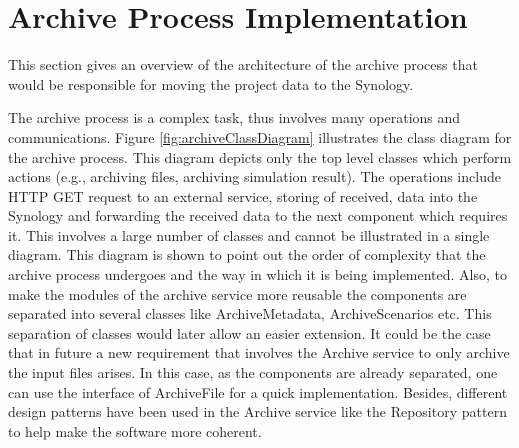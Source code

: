 \section{Archive Process Implementation}
This section gives an overview of the architecture of the archive process that would be responsible
for moving the project data to the Synology. 

The archive process is a complex 
task, thus involves many operations and communications. Figure \ref{fig:archiveClassDiagram} illustrates the class diagram for the archive process. This diagram depicts only the top level classes
which perform actions (e.g., archiving files, archiving simulation result). The operations include HTTP GET request to an external service, storing of received,
data into the Synology and forwarding the received data to the next component which requires it. This involves a large number of classes and cannot be 
illustrated in a single diagram. This diagram is shown to point out the order of complexity that the archive process undergoes and the way in which it is being
implemented. Also, to make the modules of the archive service more reusable the components are separated into several classes
like ArchiveMetadata, ArchiveScenarios etc. This separation
of classes would later allow an easier extension. It could be the case that in future a new requirement
that involves the Archive service to only archive
the input files arises. In this case, as the components are already separated, one can use the interface of ArchiveFile for a quick implementation. 
Besides, different design patterns have been used
in the Archive service like the Repository pattern \cite{repo} to help make the software more coherent.
 
